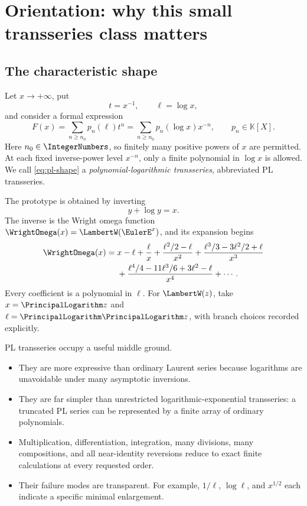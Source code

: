 \documentclass[11pt,oneside]{article}
\numberwithin{equation}{section}
\theoremstyle{definition}
\newcommand{\K}{\mathbb{K}}
\begin{document}
\clearpage
\tableofcontents
\clearpage
{}

\section{Orientation: why this small transseries class matters}

\subsection{The characteristic shape}

Let \(x\to+\infty\), put
\[
  t=x^{-1},\qquad \ell=\log x,
\]
and consider a formal expression
\begin{equation}\label{eq:pl-shape}
  F(x)=\sum_{n\ge n_0}p_n(\ell)t^n
      =\sum_{n\ge n_0}p_n(\log x)x^{-n},
  \qquad p_n\in\K[X].
\end{equation}
Here \(n_0\in\IntegerNumbers\), so finitely many positive powers of \(x\) are permitted.
At each fixed inverse-power level \(x^{-n}\), only a finite polynomial in
\(\log x\) is allowed.  We call \eqref{eq:pl-shape} a
\emph{polynomial-logarithmic transseries}, abbreviated PL transseries.

The prototype is obtained by inverting
\[
  y+\log y=x.
\]
The inverse is the Wright omega function \(\WrightOmega(x)=\LambertW(\EulerE^x)\), and its expansion
begins
\begin{equation}\label{eq:omega-preview}
\begin{split}
  \WrightOmega(x)={}&x-\ell+\frac{\ell}{x}
  +\frac{\ell^2/2-\ell}{x^2}
  +\frac{\ell^3/3-3\ell^2/2+\ell}{x^3}\\
  &+\frac{\ell^4/4-11\ell^3/6+3\ell^2-\ell}{x^4}+\cdots.
\end{split}
\end{equation}
Every coefficient is a polynomial in \(\ell\).  For \(\LambertW(z)\), take
\(x=\PrincipalLogarithm z\) and \(\ell=\PrincipalLogarithm\PrincipalLogarithm z\), with branch choices recorded explicitly.

PL transseries occupy a useful middle ground.
\begin{itemize}
\item They are more expressive than ordinary Laurent series because logarithms
  are unavoidable under many asymptotic inversions.
\item They are far simpler than unrestricted logarithmic-exponential transseries:
  a truncated PL series can be represented by a finite array of ordinary
  polynomials.
\item Multiplication, differentiation, integration, many divisions, many
  compositions, and all near-identity reversions reduce to exact finite
  calculations at every requested order.
\item Their failure modes are transparent.  For example, \(1/\ell\),
  \(\log\ell\), and \(x^{1/2}\) each indicate a specific minimal enlargement.
\end{itemize}
\end{document}
